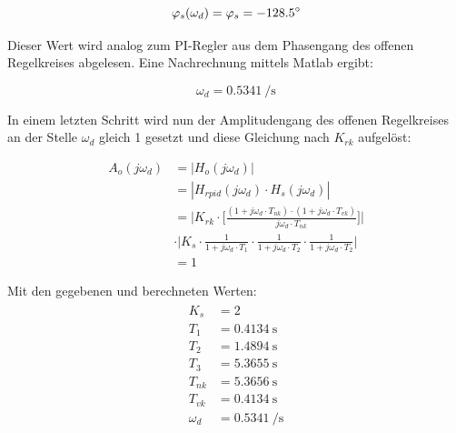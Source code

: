 \begin{equation} \label{eq:pid:omega_d_target}
    \varphi_s(\omega_d) = \varphi_s = -128.5\degree
\end{equation}

Dieser Wert wird analog zum PI-Regler aus dem Phasengang des offenen Regelkreises
abgelesen.  Eine Nachrechnung mittels Matlab ergibt:


\begin{equation} \label{eq:pid:omega_d_target}
    \omega_d = \SI{0.5341}{\per\second}
\end{equation}

In einem letzten Schritt wird  nun der Amplitudengang des offenen Regelkreises
an der  Stelle $\omega_d$ gleich 1  gesetzt und diese Gleichung  nach $K_{rk}$
aufgel\"ost:

\begin{equation} \label{eq:pid:h_o_k_rk_one}
    \begin{split}
        A_{o}(j\omega_d)    & = | H_{o}(j\omega_d) |                            \\
                            & = | H_{rpid}(j\omega_d) \cdot H_s(j\omega_d) |    \\
                            & = \Biggl \rvert
                                    K_{rk}
                                    \cdot
                                    \biggl[ \frac{(1 + j\omega_d \cdot T_{nk}) \cdot (1 + j\omega_d \cdot T_{vk}) }{ j\omega_d \cdot T_{nk} } \biggr] \Biggr \rvert \\
                            & \cdot
                                \Biggl \rvert
                                    K_s
                                    \cdot \frac{1}{1 + j\omega_d \cdot T_1}
                                    \cdot \frac{1}{1 + j\omega_d \cdot T_2}
                                    \cdot \frac{1}{1 + j\omega_d \cdot T_2}
                                    \Biggr \rvert \\
                            & = 1
    \end{split}
\end{equation}

Mit den gegebenen und berechneten Werten:
\begin{gather} \label{eq:pid:h_o_k_rk_one}
    \begin{split}
        K_s         & = 2                        \\
        T_1         & = \SI{0.4134}{\second}     \\
        T_2         & = \SI{1.4894}{\second}     \\
        T_3         & = \SI{5.3655}{\second}     \\
        T_{nk}      & = \SI{5.3656}{\second}     \\
        T_{vk}      & = \SI{0.4134}{\second}     \\
        \omega_d    & = \SI{0.5341}{\per\second}
    \end{split}
\end{gather}

